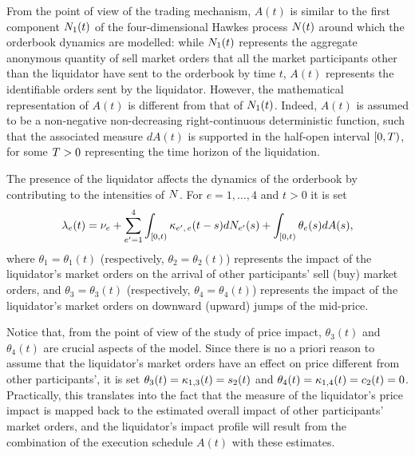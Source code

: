 \documentclass[10pt, article,table]{article}
\begin{document}
From the point of view of the trading mechanism, $A(t)$ is similar to the first component $\countingProc[1](t)$ of the four-dimensional Hawkes process $\multiCountingProc(t)$ around which the orderbook dynamics are modelled: while $\countingProc[1](t)$ represents the aggregate anonymous quantity of sell market orders that all the market participants other than the liquidator have sent to the orderbook by time $t$, $A(t)$ represents the identifiable orders sent by the liquidator.  However, the mathematical representation of $A(t)$ is different from that of  $\countingProc[1](t)$. Indeed, $A(t)$ is assumed to be a non-negative non-decreasing right-continuous deterministic function, such that the associated measure $dA(t)$ is supported in the half-open interval $[0,\timeHorizon)$, for some $\timeHorizon>0$ representing the time horizon of the liquidation.

The presence of the liquidator affects the dynamics of the orderbook by contributing to the intensities of $\multiCountingProc$. For $e=1,\dots,4$ and $t>0$ it is set 
\begin{equation}\label{eq.BM14_intensity_with_liquidator}
 \intensity[e](t) = 
 \baseRate_e
 +\sum_{\eone=1}^{4}\int_{[0,t)} \hawkesKernel\subscriptee (t-s)d\countingProc[\eone](s) 
 + \int_{[0,t)} \theta_e(s)dA(s),
\end{equation}
where $\theta_1 = \theta_1(t)$ (respectively, $\theta_2=\theta_2(t)$) represents the impact of the liquidator's market orders on the arrival of other participants' sell (buy) market orders, and $\theta_3 = \theta_3(t)$ (respectively, $\theta_4 = \theta_4(t)$) represents the impact of the liquidator's market orders on downward (upward) jumps of the mid-price.

Notice that, from the point of view of the study of price impact, $\theta_3(t)$ and $\theta_4(t)$ are crucial aspects of the model. Since there is no a priori reason to assume that the liquidator's market orders have an effect on price different from other participants', it is set $\theta_3(t) = \hawkesKernel_{1,3}(t) = s_2(t)$ and $\theta_4(t)=\hawkesKernel_{1,4}(t)=c_2(t)=0$. Practically, this translates into the fact that the measure of the liquidator's price impact is mapped back to the estimated overall impact of other participants' market orders, and the liquidator's impact profile will result from the combination of the execution schedule $A(t)$ with these estimates.
\end{document}
